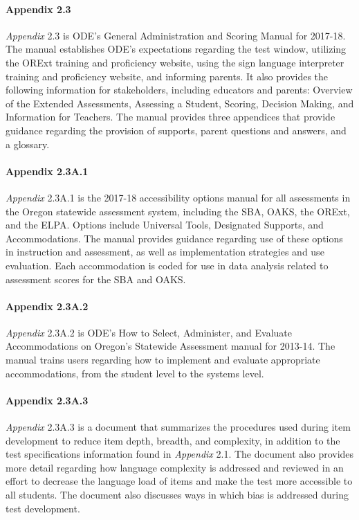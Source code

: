 \documentclass[]{article}
\let\oldparagraph\paragraph
\renewcommand{\paragraph}[1]{\oldparagraph{#1}\mbox{}}
\begin{document}
\paragraph{Appendix 2.3}\label{appendix-2.3}

\emph{Appendix} 2.3 is ODE's General Administration and Scoring Manual
for 2017-18. The manual establishes ODE's expectations regarding the
test window, utilizing the ORExt training and proficiency website, using
the sign language interpreter training and proficiency website, and
informing parents. It also provides the following information for
stakeholders, including educators and parents: Overview of the Extended
Assessments, Assessing a Student, Scoring, Decision Making, and
Information for Teachers. The manual provides three appendices that
provide guidance regarding the provision of supports, parent questions
and answers, and a glossary.

\paragraph{Appendix 2.3A.1}\label{appendix-2.3a.1}

\emph{Appendix} 2.3A.1 is the 2017-18 accessibility options manual for
all assessments in the Oregon statewide assessment system, including the
SBA, OAKS, the ORExt, and the ELPA. Options include Universal Tools,
Designated Supports, and Accommodations. The manual provides guidance
regarding use of these options in instruction and assessment, as well as
implementation strategies and use evaluation. Each accommodation is
coded for use in data analysis related to assessment scores for the SBA
and OAKS.

\paragraph{Appendix 2.3A.2}\label{appendix-2.3a.2}

\emph{Appendix} 2.3A.2 is ODE's How to Select, Administer, and Evaluate
Accommodations on Oregon's Statewide Assessment manual for 2013-14. The
manual trains users regarding how to implement and evaluate appropriate
accommodations, from the student level to the systems level.

\paragraph{Appendix 2.3A.3}\label{appendix-2.3a.3}

\emph{Appendix} 2.3A.3 is a document that summarizes the procedures used
during item development to reduce item depth, breadth, and complexity,
in addition to the test specifications information found in
\emph{Appendix} 2.1. The document also provides more detail regarding
how language complexity is addressed and reviewed in an effort to
decrease the language load of items and make the test more accessible to
all students. The document also discusses ways in which bias is
addressed during test development.
\end{document}

